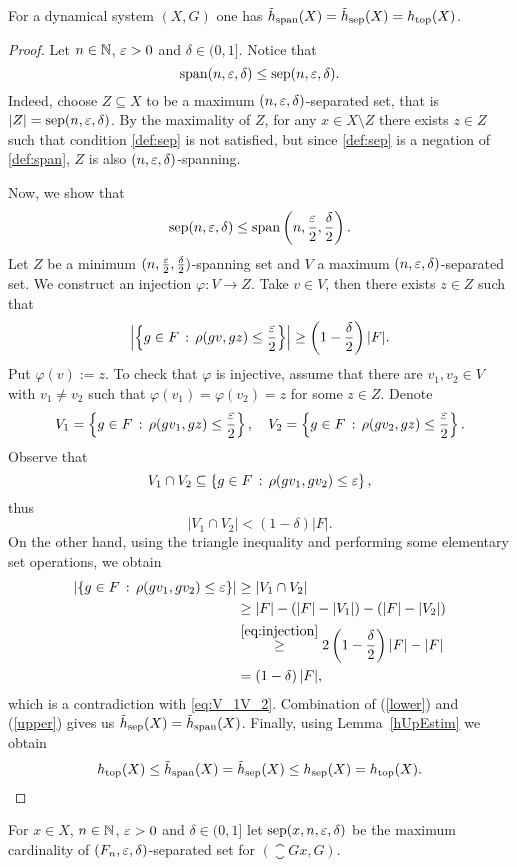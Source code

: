 \begin{lem}
For a dynamical system $(X,G)$ one has $\tilde{h}_{\mathrm{span}}(X)=\tilde{h}_{\mathrm{sep}}(X)=h_\mathrm{top}(X)$.
\end{lem}

\begin{proof}
Let $n\in\mathbb{N}$, $\varepsilon>0$ and $\delta\in(0,1]$. Notice that 
\begin{equation}\label{lower}
\operatorname{span}(n,\varepsilon,\delta)\leq \operatorname{sep}(n,\varepsilon,\delta).
\end{equation}
Indeed, choose $Z\subseteq X$ to be a maximum $(n,\varepsilon,\delta)$-separated set, that is $|Z|=\operatorname{sep}(n,\varepsilon,\delta)$. By the maximality of $Z$, for any $x\in X\setminus Z$ there exists $z\in Z$ such that condition \eqref{def:sep} is not satisfied, but since \eqref{def:sep} is a negation of \eqref{def:span},  $Z$ is also $(n,\varepsilon,\delta)$-spanning.  

Now, we show that 
\begin{equation}\label{upper}
\operatorname{sep}(n,\varepsilon,\delta)\leq \operatorname{span}\left(n,\frac{\varepsilon}{2}, \frac{\delta}{2}\right).
\end{equation}
Let $Z$ be a minimum $(n,\frac{\varepsilon}{2},\frac{\delta}{2})$-spanning set and $V$ a maximum $(n,\varepsilon,\delta)$-separated set. We construct an injection $\varphi\colon V\to Z$. Take $v\in V$, then there exists $z\in Z$ such that  
\begin{equation}\label{eq:injection}
\left|\left\{g\in F\,:\,\rho(gv, gz)\leq\frac{\varepsilon}{2}\right\}\right|\geq\left(1-\frac{\delta}{2}\right)|F|.
\end{equation}
Put $\varphi(v) := z$. To check that $\varphi$ is injective, assume that there are $v_1,v_2\in V$  with $v_1\neq v_2$ such that $\varphi(v_1) = \varphi(v_2)=z$ for some $z\in Z$. Denote 
\[
V_1 =\left\{g\in F\,:\,\rho(gv_1, gz)\leq\frac{\varepsilon}{2}\right\}, \quad 
V_2=\left\{g\in F\,:\,\rho(gv_2, gz)\leq\frac{\varepsilon}{2}\right\}.
\]
Observe that 
\[
V_1\cap V_2\subseteq \left\{g\in F\,:\,\rho(gv_1, gv_2)\leq\varepsilon\right\},
\]
thus 
\begin{equation}\label{eq:V_1V_2}
|V_1\cap V_2|<(1-\delta)|F|.
\end{equation}
On the other hand, using the triangle inequality and performing some elementary set operations, 
we obtain
\begin{align*}
\left|\left\{g\in F\,:\,\rho(gv_1, gv_2)\leq\varepsilon\right\}\right|&\geq \left|V_1\cap V_2\right| \\
&\geq |F|-(|F|-|V_1|) - (|F|-|V_2|)  \\
 &\stackrel{\eqref{eq:injection}}{\geq} 2\left(1-\frac{\delta}{2}\right)|F| - |F| \\
 &=\left(1-\delta\right)|F|,
\end{align*}
which is a contradiction with \eqref{eq:V_1V_2}.
Combination of (\ref{lower}) and (\ref{upper}) gives us $\tilde{h}_{\mathrm{sep}}(X)=\tilde{h}_{\mathrm{span}}(X)$.
Finally, using Lemma~\ref{hUpEstim} we obtain
\[
h_\mathrm{top}(X)\leq \tilde{h}_{\mathrm{span}}(X)=\tilde{h}_{\mathrm{sep}}(X)\leq h_{\mathrm{sep}}(X)=h_\mathrm{top}(X). \qedhere
\] 
\end{proof}
\noindent
For $x\in X$, $n\in\mathbb{N}$, $\varepsilon>0$ and $\delta\in(0,1]$ let $\operatorname{sep}(x,n,\varepsilon,\delta)$ be the maximum cardinality of $(F_n, \varepsilon, \delta)$-separated set for $(\closure{Gx},G)$.

